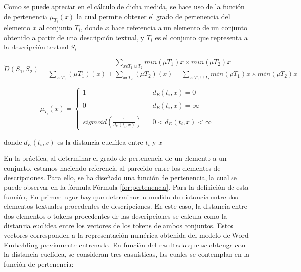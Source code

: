 Como se puede apreciar en el cálculo de dicha medida, se hace uso de la función de pertenencia $\mu_{T_{i}}(x)$ la cual permite obtener el grado de pertenencia del elemento $x$ al conjunto $T_{i}$, donde $x$ hace referencia a un elemento de un conjunto obtenido a partir de una descripción textual, y  $T_{i}$ es el conjunto que representa a la descripción textual $S_{i}$.

\begin{equation}
\label{formula:fuzzy-document}
   \textstyle \tilde{D}(S_{1},S_{2})=\frac{\sum_{x\epsilon T_{1}\cup T_{2} }min(\mu T_{1})x \times min(\mu T_{2})x}{\sum_{x\epsilon T_{1} }(\mu T_{1} )(x)+\sum_{x\epsilon T_{2} }(\mu T_{2} )(x)-\sum_{x\epsilon T_{1}\cup T_{2} }min(\mu T_{1})x \times min(\mu T_{2})x}  
\end{equation}\label{for:pertenencia}
    

\begin{equation}
\label{formula:fuzzy-document-2}
\mu_{T_{i}}(x)= \left\{ \begin{array}{lcc}
         1 &   & d_{E}(t_{i},x) = 0 \\
         \\ 0 &   &  d_{E}(t_{i},x) = \infty \\
         \\ sigmoid(\frac{1}{d_{E}(t_{i},x)}) &    & 0 < d_{E}(t_{i},x) < \infty 
         \end{array}
\right .   
\end{equation}
\begin{center}
    donde $d_{E}(t_{i},x)$ es la distancia euclídea entre $t_{i}$ y $x$
\end{center}
    
En la práctica, al determinar el grado de pertenencia de un elemento a un conjunto, estamos haciendo referencia al parecido entre los elementos de descripciones. Para ello, se ha diseñado una función de pertenencia, la cual se puede observar en la fórmula Fórmula \ref{for:pertenencia}. Para la definición de esta función, En primer lugar hay que determinar la medida de distancia entre dos elementos textuales procedentes de descripciones. En este caso, la distancia entre dos elementos o tokens procedentes de las  descripciones se calcula como la distancia euclídea entre los vectores de los tokens de ambos conjuntos. Estos vectores corresponden a la representación numérica obtenida del modelo de Word Embedding previamente entrenado. En función del resultado que se obtenga con la distancia euclídea, se consideran tres casuísticas, las cuales se contemplan en la función de pertenencia:

